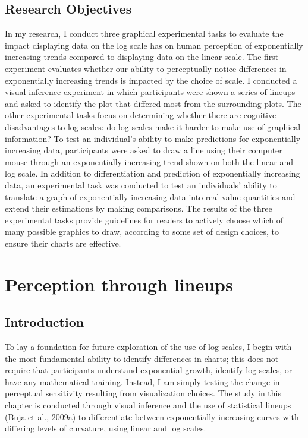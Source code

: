 \documentclass[print]{nuthesis}
\begin{document}
\hypertarget{research-objectives}{%
\section{Research Objectives}\label{research-objectives}}

In my research, I conduct three graphical experimental tasks to evaluate the impact displaying data on the log scale has on human perception of exponentially increasing trends compared to displaying data on the linear scale.
The first experiment evaluates whether our ability to perceptually notice differences in exponentially increasing trends is impacted by the choice of scale. I conducted a visual inference experiment in which participants were shown a series of lineups and asked to identify the plot that differed most from the surrounding plots.
The other experimental tasks focus on determining whether there are cognitive disadvantages to log scales: do log scales make it harder to make use of graphical information?
To test an individual's ability to make predictions for exponentially increasing data, participants were asked to draw a line using their computer mouse through an exponentially increasing trend shown on both the linear and log scale.
In addition to differentiation and prediction of exponentially increasing data, an experimental task was conducted to test an individuals' ability to translate a graph of exponentially increasing data into real value quantities and extend their estimations by making comparisons.
The results of the three experimental tasks provide guidelines for readers to actively choose which of many possible graphics to draw, according to some set of design choices, to ensure their charts are effective.

\hypertarget{lineups}{%
\chapter{Perception through lineups}\label{lineups}}

\hypertarget{introduction}{%
\section{Introduction}\label{introduction}}

To lay a foundation for future exploration of the use of log scales, I begin with the most fundamental ability to identify differences in charts; this does not require that participants understand exponential growth, identify log scales, or have any mathematical training.
Instead, I am simply testing the change in perceptual sensitivity resulting from visualization choices.
The study in this chapter is conducted through visual inference and the use of statistical lineups (Buja et al., 2009a) to differentiate between exponentially increasing curves with differing levels of curvature, using linear and log scales.
\end{document}
